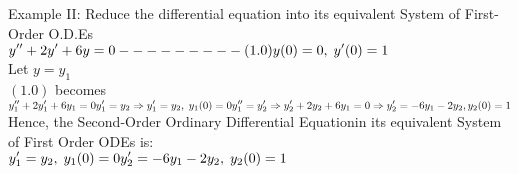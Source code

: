\documentclass[a4paper 11pt]{article}
\newcommand{\NI}{\noindent}
\newcommand{\dsp}{\displaystyle}
\newcommand{\be}{\(\dsp} %
\newcommand{\ee}{\)\\[0.3cm]} %
\newcommand{\sprime}{'}
\newcommand{\dprime}{''}
\newcommand{\imp}{\Rightarrow}
\renewcommand{\sp}{\\[0.3cm]}
\newcommand{\spn}[1]{\\[#1]}
\newcommand{\ODE}{Ordinary Differential Equation}
\newcommand{\yn}[1]{y_{#1}}
\begin{document}
\NI Example II: Reduce the differential equation into its equivalent System of First-Order O.D.Es\\[0.2cm]
\be
y\dprime + 2y\sprime + 6y = 0  - - - - - - - - - (1.0) \\[0.2cm]
y(0) = 0, \; y\sprime(0) = 1
\ee
Let \(y =y_1\) \spn{0.1cm}
\((1.0)\) becomes \sp
\be
\yn{1}\dprime + 2\yn{1}\sprime + 6\yn{1} = 0 \spn{0.1cm}
\yn{1}\sprime = \yn{2} \imp \yn{1}\sprime = \yn{2}, \; \yn{1}(0) = 0 \\[0.2cm]
\yn{1}\dprime = \yn{2}\sprime \\[0.2cm]
\imp \yn{2}\sprime + 2y_2 + 6y_1 = 0 \imp \yn{2}\sprime = -6y_1 - 2y_2 , y_2(0) = 1
\ee
Hence, the Second-Order \ODE in its equivalent System of First Order ODEs is:\sp
\be 
\yn{1}\sprime = \yn{2} , \; \yn{1}(0) = 0 \sp
\yn{2}\sprime = - 6y_1 - 2y_2 , \; y_2(0) = 1
\ee
\end{document}
